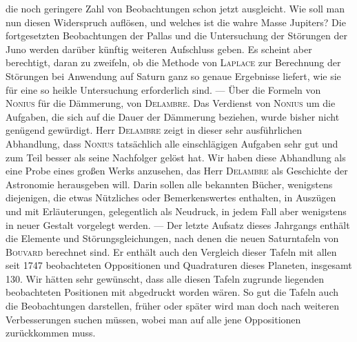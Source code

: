 die noch geringere Zahl von Beobachtungen schon jetzt ausgleicht. Wie soll man nun diesen Widerspruch auflösen, und welches ist die wahre Masse Jupiters? Die fortgesetzten Beobachtungen der Pallas und die Untersuchung der Störungen der Juno werden darüber künftig weiteren Aufschluss geben. Es scheint aber berechtigt, daran zu zweifeln, ob die Methode von \textsc{Laplace} zur Berechnung der Störungen bei Anwendung auf Saturn ganz so genaue Ergebnisse liefert, wie sie für eine so heikle Untersuchung erforderlich sind. --- Über die Formeln von \textsc{Nonius} für die Dämmerung, von \textsc{Delambre}. Das Verdienst von \textsc{Nonius} um die Aufgaben, die sich auf die Dauer der Dämmerung beziehen, wurde bisher nicht genügend gewürdigt. Herr \textsc{Delambre} zeigt in dieser sehr ausführlichen Abhandlung, dass \textsc{Nonius} tatsächlich alle einschlägigen Aufgaben sehr gut und zum Teil besser als seine Nachfolger gelöst hat. Wir haben diese Abhandlung als eine Probe eines großen Werks anzusehen, das Herr \textsc{Delambre} als Geschichte der Astronomie herausgeben will. Darin sollen alle bekannten Bücher, wenigstens diejenigen, die etwas Nützliches oder Bemerkenswertes enthalten, in Auszügen und mit Erläuterungen, gelegentlich als Neudruck, in jedem Fall aber wenigstens in neuer Gestalt vorgelegt werden. --- Der letzte Aufsatz dieses Jahrgangs enthält die Elemente und Störungsgleichungen, nach denen die neuen Saturntafeln von \textsc{Bouvard} berechnet sind. Er enthält auch den Vergleich dieser Tafeln mit allen seit 1747 beobachteten Oppositionen und Quadraturen dieses Planeten, insgesamt 130. Wir hätten sehr gewünscht, dass alle diesen Tafeln zugrunde liegenden beobachteten Positionen mit abgedruckt worden wären. So gut die Tafeln auch die Beobachtungen darstellen, früher oder später wird man doch nach weiteren Verbesserungen suchen müssen, wobei man auf alle jene Oppositionen zurückkommen muss.
\par\clearpage\endgroup
